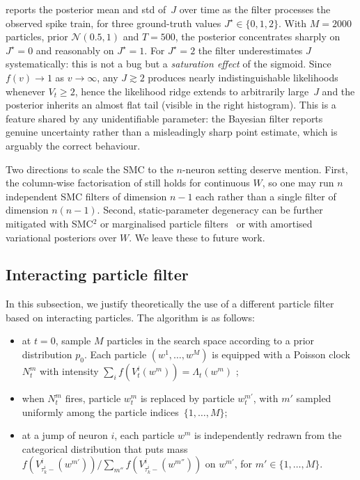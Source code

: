 \documentclass[11pt,a4paper]{article}
\theoremstyle{definition}
\newcommand{\cN}{\mathcal{N}}
\begin{document}
 reports the posterior mean and std of~$J$ over time as
the filter processes the observed spike train, for three ground-truth
values $J^\star \in \{0, 1, 2\}$. With $M = 2000$ particles, prior
$\cN(0.5, 1)$ and $T = 500$, the posterior concentrates sharply on
$J^\star = 0$ and reasonably on $J^\star = 1$. For $J^\star = 2$ the
filter underestimates $J$ systematically: this is not a bug but a
\emph{saturation effect} of the sigmoid. Since $f(v) \to 1$ as
$v \to \infty$, any $J \gtrsim 2$ produces nearly indistinguishable
likelihoods whenever $V_t \geq 2$, hence the likelihood ridge extends
to arbitrarily large~$J$ and the posterior inherits an almost flat
tail (visible in the right histogram). This is a feature shared by any
unidentifiable parameter: the Bayesian filter reports genuine
uncertainty rather than a misleadingly sharp point estimate, which is
arguably the correct behaviour.

Two directions to scale the SMC to the $n$-neuron setting deserve
mention. First, the column-wise factorisation of
 still holds for continuous $W$, so one may
run $n$ independent SMC filters of dimension $n-1$ each rather than a
single filter of dimension $n(n-1)$. Second, static-parameter
degeneracy can be further mitigated with SMC$^2$ or marginalised
particle filters~\citep{ChopinJacob2013} or with amortised variational
posteriors over $W$. We leave these to future work.

\subsection{Interacting particle filter}
In this subsection, we justify theoretically the use of a different particle filter based on interacting particles. The algorithm is as follows:
\begin{itemize}
    \item at $t = 0$, sample $M$ particles in the search space according to a prior distribution $p_0$. Each particle $(w^1, \ldots, w^M)$ is equipped with a Poisson clock $N_t^m$ with intensity $\sum_i f(V_t^i (w^m)) = \Lambda_t (w^m)$ ;

    \item when $N_t^m$ fires, particle $w_t^m$ is replaced by particle $w_t^{m'}$, with $m'$ sampled uniformly among the particle indices~$\{1,\ldots,M\}$;

    \item at a jump of neuron $i$, each particle $w^m$ is independently redrawn from the categorical distribution that puts mass $f(V_{\tau_k^i-}^i(w^{m'}))/\sum_{m''} f(V_{\tau_k^i-}^i(w^{m''}))$ on $w^{m'}$, for $m' \in \{1,\ldots,M\}$.
\end{itemize}
\end{document}
